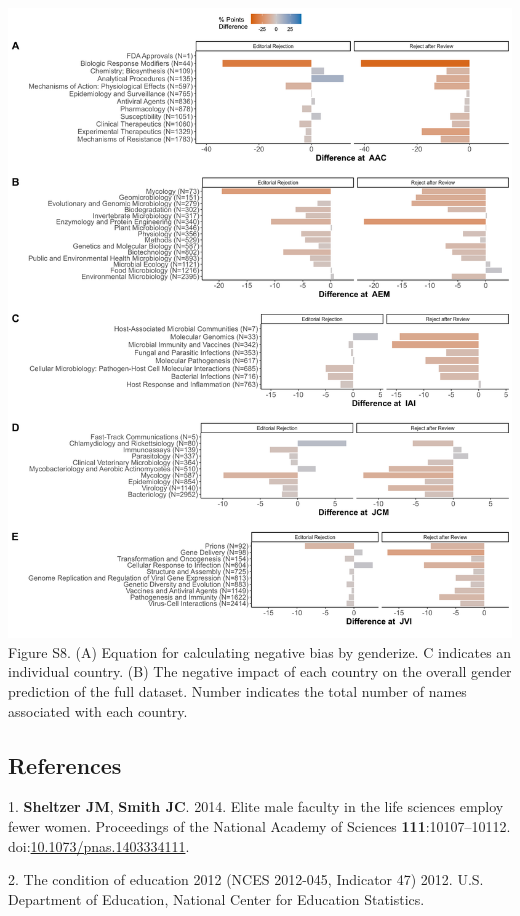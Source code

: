 \documentclass[11pt,]{article}
\begin{document}
\newpage

\includegraphics{Figure_S8.png} Figure S8. (A) Equation for calculating
negative bias by genderize. C indicates an individual country. (B) The
negative impact of each country on the overall gender prediction of the
full dataset. Number indicates the total number of names associated with
each country.

\subsection*{References}\label{references}

\hypertarget{refs}{}
\hypertarget{ref-sheltzer_elite_2014}{}
1. \textbf{Sheltzer JM}, \textbf{Smith JC}. 2014. Elite male faculty in
the life sciences employ fewer women. Proceedings of the National
Academy of Sciences \textbf{111}:10107--10112.
doi:\href{https://doi.org/10.1073/pnas.1403334111}{10.1073/pnas.1403334111}.

\hypertarget{ref-NCES_condition_2011}{}
2. The condition of education 2012 (NCES 2012-045, Indicator 47) 2012.
U.S. Department of Education, National Center for Education Statistics.
\end{document}
